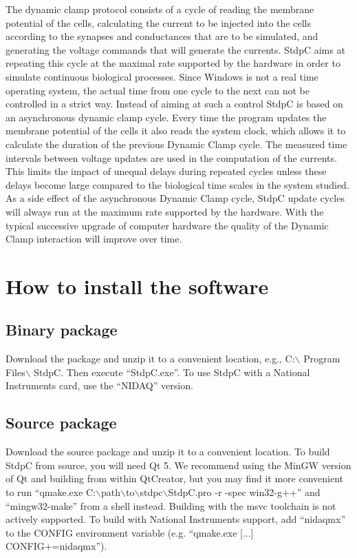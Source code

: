 \documentclass{article}
\begin{document}
The dynamic clamp protocol consists of a cycle of reading the membrane
potential of the cells, calculating the current to be injected into
the cells according to the synapses and conductances that are to be
simulated, and generating the voltage commands that will generate the
currents. StdpC aims at repeating this cycle at the maximal rate
supported by the hardware in order to simulate continuous biological
processes. Since Windows is not a real time operating system, the
actual time from one cycle to the next can not be controlled in a
strict way. Instead of aiming at such a control StdpC is based on an
asynchronous dynamic clamp cycle.  Every time the program updates the
membrane potential of the cells it also reads the system clock,
which allows it to calculate the duration of the previous
Dynamic Clamp cycle. The measured time intervals between voltage
updates are used in the computation of the currents. This limits the
impact of unequal delays during repeated cycles unless these delays
become large compared to the biological time scales in the system
studied. As a side effect of the asynchronous Dynamic Clamp cycle,
StdpC update cycles will always run at the maximum rate supported by
the hardware. With the typical successive upgrade of computer hardware
the quality of the Dynamic Clamp interaction will improve over time.


\section{How to install the software}

\subsection{Binary package}
Download the package and unzip it to a convenient location, e.g.,
C:$\backslash$ Program Files$\backslash$ StdpC. Then execute ``StdpC.exe''.
To use StdpC with a National Instruments card, use the ``NIDAQ'' version.

\subsection{Source package}
Download the source package and unzip it to a convenient
location. To build StdpC from source, you will need Qt 5. 
We recommend using the MinGW version of Qt and building from within QtCreator, 
but you may find it more convenient to run 
``qmake.exe C:$\backslash$path$\backslash$to$\backslash$stdpc$\backslash$StdpC.pro -r -spec win32-g++''
and ``mingw32-make'' from a shell instead. Building with the msvc toolchain is not actively supported.
To build with National Instruments support, add ``nidaqmx'' to the CONFIG environment variable 
(e.g. ``qmake.exe [...] CONFIG+=nidaqmx'').
\end{document}
